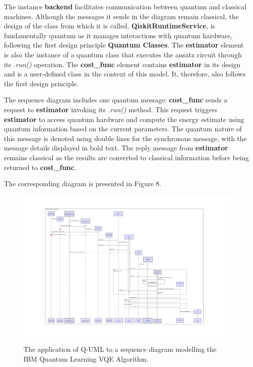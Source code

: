 \documentclass{article}
\begin{document}
The instance \textbf{backend} facilitates communication between quantum and classical machines. Although the messages it sends in the diagram remain classical, the design of the class from which it is called, \textbf{QiskitRuntimeService}, is fundamentally quantum as it manages interactions with quantum hardware, following the first design principle \textbf{Quantum Classes}. The \textbf{estimator} element is also the instance of a quantum class that executes the ansatz circuit through its \textit{.run()} operation. The \textbf{cost\_func} element contains \textbf{estimator} in its design and is a user-defined class in the context of this model. It, therefore, also follows the first design principle. 

The sequence diagram includes one quantum message: \textbf{cost\_func} sends a request to \textbf{estimator} invoking its \textit{.run()} method. This request triggers \textbf{estimator} to access quantum hardware and compute the energy estimate using quantum information based on the current parameters. The quantum nature of this message is denoted using double lines for the synchronous message, with the message details displayed in bold text. The reply message from \textbf{estimator} remains classical as the results are converted to classical information before being returned to \textbf{cost\_func}.

The corresponding diagram is presented in Figure 8.

\begin{figure}
    \centering
    \includegraphics[width=1\linewidth]{VQE QUML SD Final Version.pdf}
    \caption{The application of Q-UML to a sequence diagram modelling the IBM Quantum Learning VQE Algorithm.}
    \label{fig:Q-UML_SD}
\end{figure}
\end{document}

